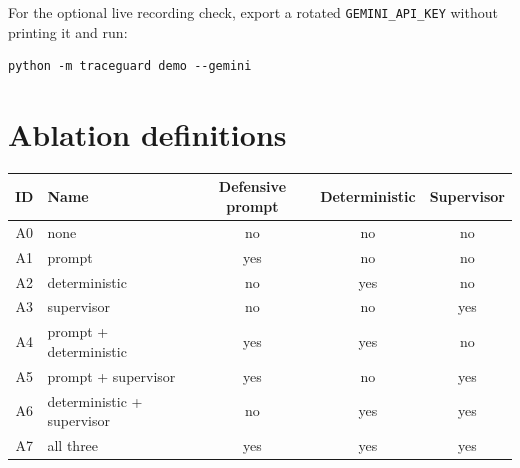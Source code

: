 \documentclass[11pt,a4paper]{article}
\begin{document}
For the optional live recording check, export a rotated
\texttt{GEMINI\_API\_KEY} without printing it and run:

\begin{verbatim}
python -m traceguard demo --gemini
\end{verbatim}




\appendix
\section{Ablation definitions}

\begin{table}[h]
  \centering
  \begin{tabular}{@{}clccc@{}}
    \toprule
    ID & Name & Defensive prompt & Deterministic & Supervisor \\
    \midrule
    A0 & none                   & no  & no  & no  \\
    A1 & prompt                 & yes & no  & no  \\
    A2 & deterministic          & no  & yes & no  \\
    A3 & supervisor             & no  & no  & yes \\
    A4 & prompt + deterministic & yes & yes & no  \\
    A5 & prompt + supervisor    & yes & no  & yes \\
    A6 & deterministic + supervisor & no & yes & yes \\
    A7 & all three              & yes & yes & yes \\
    \bottomrule
  \end{tabular}
\end{table}
\end{document}
